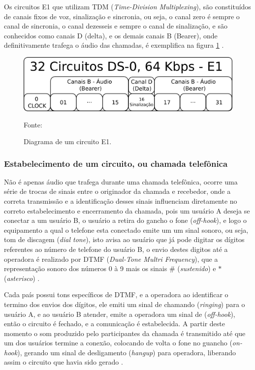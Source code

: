Os circuitos E1 que utilizam TDM (\textit{Time-Division Multiplexing}), são constituídos de canais fixos de voz, sinalização e sincronia, ou seja, o canal zero é sempre o canal de sincronia, o canal dezesseis e sempre o canal de sinalização, e são conhecidos como canais D (delta), e os demais canais B (Bearer), onde definitivamente trafega o áudio das chamadas, é exemplifica na figura \ref{Figura5} \cite{andersonramires2005}.

\begin{figure}[h]
	\centering
	\includegraphics[width=15.0cm]{imagens/LinkE1.png}
	\caption{Diagrama de um circuito E1.}
    \label{Figura5}
    Fonte: \cite{alexandrekeller2014}
\end{figure}

\subsubsection{Estabelecimento de um circuito, ou chamada telefônica}

Não é apenas áudio que trafega durante uma chamada telefônica, ocorre uma série de trocas de sinais entre o originador da chamada e recebedor, onde a correta transmissão e a identificação desses sinais influenciam diretamente no correto estabelecimento e encerramento da chamada, pois um usuário A deseja se conectar a um usuário B, o usuário a retira do gancho o fone (\textit{off-hook}), e logo o equipamento a qual o telefone esta conectado emite um um sinal sonoro, ou seja, tom de discagem (\textit{dial tone}), isto avisa ao usuário que já pode digitar os dígitos referentes ao número de telefone do usuário B, o envio destes digitos até a operadora é realizado por DTMF (\textit{Dual-Tone Multri Frequency}), que a representação sonoro dos números 0 à 9 mais os sinais \# (\textit{sustenido}) e $ \ast $ (\textit{asterisco}) \cite{alexandrekeller2014}.

Cada país possui tons específicos de DTMF, e a operadora ao identificar o termino dos envios dos dígitos, ele emiti um sinal de chamando (\textit{ringing}) para o usuário A, e ao usuário B atender, emite a operadora um sinal de (\textit{off-hook}), então o circuito é fechado, e a comunicação é estabelecida. A partir deste momento o som produzido pelo participantes da chamada é transmitido até que um dos usuários termine a conexão, colocando de volta o fone no guancho (\textit{on-hook}), gerando um sinal de desligamento (\textit{hangup}) para operadora, liberando assim o circuito que havia sido gerado \cite{eduardotude2014}.

